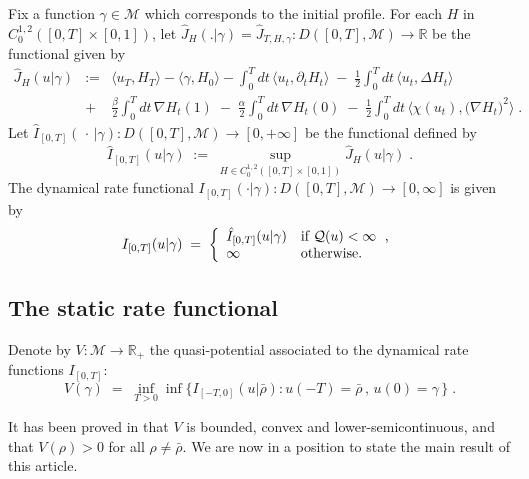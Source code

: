 \documentclass[reqno]{amsart}
\begin{document}
Fix a function $\gamma\in{{\mathscr M}}$ which corresponds to the initial
profile.  For each $H$ in $C^{1,2}_0([0,T]\times[0,1])$, let $\hat
J_{H}(.|\gamma) = \hat J_{T, H, \gamma} \colon D([0,T], {{\mathscr M}})\longrightarrow
{{\mathbb R}}$ be the functional given by
\begin{eqnarray}
\label{o01}
\hat J_H(u|\gamma) &:=& \big\langle u_T, H_T \big\rangle 
- \langle \gamma, H_0 \rangle
- \int_0^{T} \!dt\, \big\langle u_t, \partial_t H_t \big\rangle
\;-\; \frac 12 \int_0^{T} \!dt\, \big\langle u_t , \Delta H_t
\big\rangle\\
&+ &\frac {\beta}2   \int_0^{T} \! dt\, \nabla H_t(1) 
\; -\;  \frac {\alpha}2  \int_0^{T} \!dt\, \nabla H_t(0) 
\;-\; \frac 12 \int_0^{T} \!dt\,
\big\langle \chi( u_t ), \big( \nabla H_t \big)^2 \big\rangle \; .    
\nonumber 
\end{eqnarray}
Let $\hat I_{[0,T]} (\, \cdot \, | \gamma) \colon D([0,T],{{\mathcal M}})\longrightarrow [0,+\infty]$ be the functional defined by
\begin{equation*}
\hat I_{[0,T]} (u | \gamma) \; :=\; \sup_{H\in
  C^{1,2}_0([0,T]\times[0,1])} \hat J_H(u|\gamma)\; .
\end{equation*}
The dynamical rate functional $I_{[0,T]}(\cdot | \gamma): D([0,T], {{\mathscr M}}) \to [0,\infty]$ is given by
\begin{equation}
\label{26}
I_{[0,T]}(u | \gamma) \;=\; 
\left\{
\begin{array}{ll}
\hat I_{[0,T]} (u | \gamma) & \text{if ${{\mathcal Q}}(u) < \infty$ \;,} \\
\infty & \text{otherwise.}
\end{array}
\right.
\end{equation}

\subsection*{The static rate functional}
Denote by $V: {{\mathscr M}} \to {{\mathbb R}}_+$ the quasi-potential associated to the
dynamical rate functions $I_{[0,T]}$:
\begin{equation}
\label{08}
V(\gamma) \;=\; \inf_{T>0} \inf \big\{ I_{[-T,0]} (u | \bar\rho) : u(-T) =
\bar\rho \,,\, u(0)=\gamma \,\}\;.
\end{equation}

It has been proved in \cite[Theorems 2.2, 4.5 and A.1]{bdgjl3} that
$V$ is bounded, convex and lower-semicontinuous, and that $V(\rho) >0$
for all $\rho\not = \bar\rho$. We are now in a position to state the
main result of this article.
\end{document}
